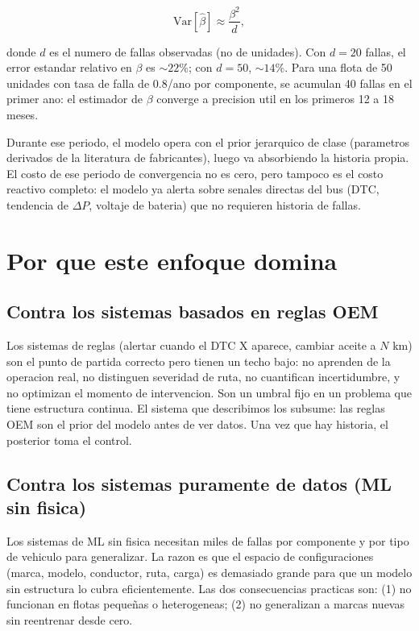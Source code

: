\documentclass[11pt,a4paper]{article}
\begin{document}
$$\mathrm{Var}[\hat\beta] \approx \frac{\beta^2}{d},$$

donde $d$ es el numero de fallas observadas (no de unidades). Con $d = 20$
fallas, el error estandar relativo en $\beta$ es $\sim 22\%$; con $d = 50$,
$\sim 14\%$. Para una flota de 50 unidades con tasa de falla de 0.8/ano
por componente, se acumulan 40 fallas en el primer ano: el estimador de
$\beta$ converge a precision util en los primeros 12 a 18 meses.

Durante ese periodo, el modelo opera con el prior jerarquico de clase
(parametros derivados de la literatura de fabricantes), luego va absorbiendo
la historia propia. El costo de ese periodo de convergencia no es cero,
pero tampoco es el costo reactivo completo: el modelo ya alerta sobre
senales directas del bus (DTC, tendencia de $\Delta P$, voltaje de bateria)
que no requieren historia de fallas.

\section{Por que este enfoque domina}

\subsection{Contra los sistemas basados en reglas OEM}

Los sistemas de reglas (alertar cuando el DTC X aparece, cambiar aceite a
$N$ km) son el punto de partida correcto pero tienen un techo bajo:
no aprenden de la operacion real, no distinguen severidad de ruta,
no cuantifican incertidumbre, y no optimizan el momento de intervencion.
Son un umbral fijo en un problema que tiene estructura continua.
El sistema que describimos los subsume: las reglas OEM son el prior
del modelo antes de ver datos. Una vez que hay historia, el posterior
toma el control.

\subsection{Contra los sistemas puramente de datos (ML sin fisica)}

Los sistemas de ML sin fisica necesitan miles de fallas por componente
y por tipo de vehiculo para generalizar. La razon es que el espacio de
configuraciones (marca, modelo, conductor, ruta, carga) es demasiado grande
para que un modelo sin estructura lo cubra eficientemente. Las dos
consecuencias practicas son: (1) no funcionan en flotas pequeñas o
heterogeneas; (2) no generalizan a marcas nuevas sin reentrenar desde cero.
\end{document}
